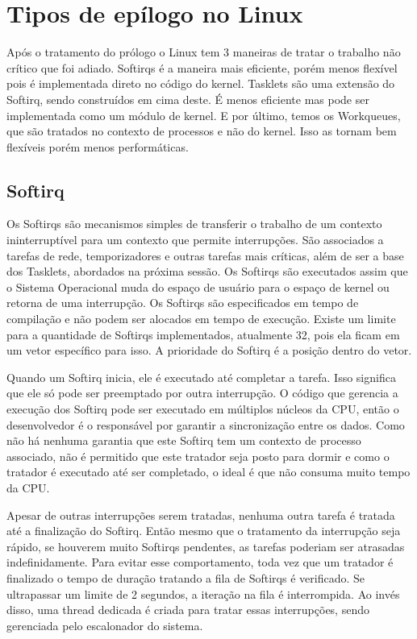 \section{Tipos de epílogo no Linux}

Após o tratamento do prólogo o Linux tem 3 maneiras de tratar o trabalho não crítico que foi adiado. Softirqs é a maneira mais eficiente, porém menos flexível pois é implementada direto no código do kernel. Tasklets são uma extensão do Softirq, sendo construídos em cima deste. É menos eficiente mas pode ser implementada como um módulo de kernel. E por último, temos os Workqueues, que são tratados no contexto de processos e não do kernel. Isso as tornam bem flexíveis porém menos performáticas. \cite{OReilly}

\subsection{Softirq}

Os Softirqs são mecanismos simples de transferir o trabalho de um contexto ininterruptível para um contexto que permite interrupções. São associados a tarefas de rede, temporizadores e outras tarefas mais críticas, além de ser a base dos Tasklets, abordados na próxima sessão. Os Softirqs são executados assim que o Sistema Operacional muda do espaço de usuário para o espaço de kernel ou retorna de uma interrupção. Os Softirqs são especificados em tempo de compilação e não podem ser alocados em tempo de execução. Existe um limite para a quantidade de Softirqs implementados, atualmente 32, pois ela ficam em um vetor específico para isso. A prioridade do Softirq é a posição dentro do vetor.

Quando um Softirq inicia, ele é executado até completar a tarefa. Isso significa que ele só pode ser preemptado por outra interrupção. O código que gerencia a execução dos Softirq pode ser executado em múltiplos núcleos da CPU, então o desenvolvedor é o responsável por garantir a sincronização entre os dados. Como não há nenhuma garantia que este Softirq tem um contexto de processo associado, não é permitido que este tratador seja posto para dormir e como o tratador é executado até ser completado, o ideal é que não consuma muito tempo da CPU.

Apesar de outras interrupções serem tratadas, nenhuma outra tarefa é tratada até a finalização do Softirq. Então mesmo que o tratamento da interrupção seja rápido, se houverem muito Softirqs pendentes, as tarefas poderiam ser atrasadas indefinidamente. Para evitar esse comportamento, toda vez que um tratador é finalizado o tempo de duração tratando a fila de Softirqs é verificado. Se ultrapassar um limite de 2 segundos, a iteração na fila é interrompida. Ao invés disso, uma thread dedicada é criada para tratar essas interrupções, sendo gerenciada pelo escalonador do sistema.

